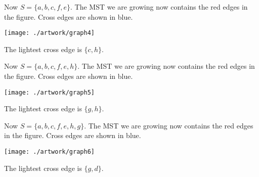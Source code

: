 \documentclass{beamer}
\def\vgap{\vspace{5mm}}
\begin{document}
\begin{frame}
\begin{small}

    Now $S = \{a, b, c, f, e\}$. The MST we are growing now contains the red edges in the figure. Cross edges are shown in blue.

    \vgap
    
    \begin{center} 
        \texttt{[image: ./artwork/graph4]} 
    \end{center}

    The lightest cross edge is $\{c, h\}$.

\end{small}    
\end{frame}
\begin{frame}
\begin{small}

    Now $S = \{a, b, c, f, e, h\}$. The MST we are growing now contains the red edges in the figure. Cross edges are shown in blue.

    \vgap
    
    \begin{center} 
        \texttt{[image: ./artwork/graph5]} 
    \end{center}

    The lightest cross edge is $\{g, h\}$.
\end{small}    
\end{frame}
\begin{frame}
\begin{small}

    Now $S = \{a, b, c, f, e, h, g\}$. The MST we are growing now contains the red edges in the figure. Cross edges are shown in blue.

    \vgap
    
    \begin{center} 
        \texttt{[image: ./artwork/graph6]} 
    \end{center}

    The lightest cross edge is $\{g, d\}$.

\end{small}    
\end{frame}
\end{document}
